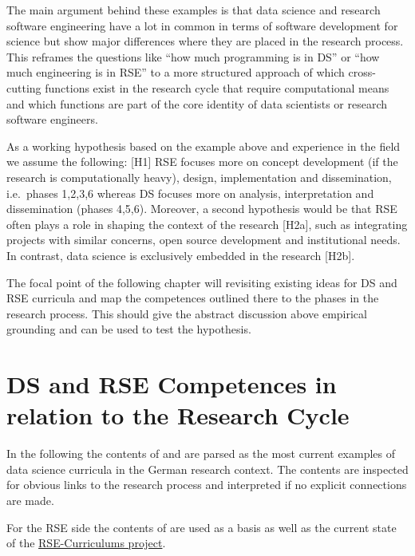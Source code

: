 \documentclass[
        english,biblatex
    ]{lni}
\begin{document}
    The main argument behind these examples is that data science and
    research software engineering have a lot in common in terms of
    software development for science but show major differences where
    they are placed in the research process. This reframes the questions
    like ``how much programming is in DS'' or ``how much engineering is
    in RSE'' to a more structured approach of which cross-cutting
    functions exist in the research cycle that require computational
    means and which functions are part of the core identity of data
    scientists or research software engineers.

    As a working hypothesis based on the example above and experience in
    the field we assume the following: {[}H1{]} RSE focuses more on
    concept development (if the research is computationally heavy),
    design, implementation and dissemination, i.e.~phases 1,2,3,6
    whereas DS focuses more on analysis, interpretation and
    dissemination (phases 4,5,6). Moreover, a second hypothesis would be
    that RSE often plays a role in shaping the context of the research
    {[}H2a{]}, such as integrating projects with similar concerns, open
    source development and institutional needs. In contrast, data
    science is exclusively embedded in the research {[}H2b{]}.

    The focal point of the following chapter will revisiting existing
    ideas for DS and RSE curricula and map the competences outlined
    there to the phases in the research process. This should give the
    abstract discussion above empirical grounding and can be used to
    test the hypothesis.

    \section{DS and RSE Competences in relation to the Research
    Cycle}\label{ds-and-rse-competences-in-relation-to-the-research-cycle}

    In the following the contents of \autocite{GI2021DataScience} and
    \autocite{petersen_2025_15025246} are parsed as the most current
    examples of data science curricula in the German research context.
    The contents are inspected for obvious links to the research process
    and interpreted if no explicit connections are made.

    For the RSE side the contents of \autocite{Goth2024RSE} are used as
    a basis as well as the current state of the
    \href{https://github.com/juliandehne/RSE-Masters/blob/main/curriculum.md}{RSE-Curriculums
    project}.
\end{document}
